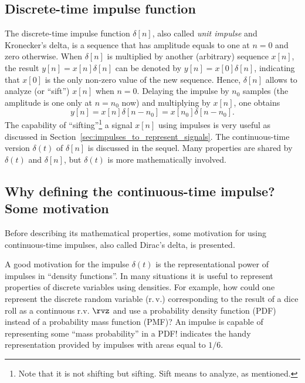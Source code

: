 \subsection{Discrete-time impulse function}

The discrete-time impulse function $\delta[n]$, also called \emph{unit impulse} and Kronecker's delta, is a sequence that has amplitude equals to one at $n=0$ and zero otherwise. When $\delta[n]$ is multiplied by another (arbitrary) sequence $x[n]$, the result $y[n]=x[n] \delta[n]$ can be denoted by $y[n] = x[0] \delta[n]$, indicating that $x[0]$ is the only non-zero value of the new sequence. Hence, $\delta[n]$ allows to analyze (or ``sift'') $x[n]$ when $n=0$. Delaying the impulse by $n_0$ samples (the amplitude is one only at $n=n_0$ now) and multiplying by $x[n]$, one obtains 
\begin{equation}
y[n]=x[n] \delta[n-n_0] = x[n_0] \delta[n-n_0].
\label{eq:siftingDiscreteTime}
\end{equation}
The capability of ``sifting''\footnote{Note that it is not shifting but sifting. Sift means to analyze, as mentioned.} a signal $x[n]$ using impulses is very useful as discussed in Section~\ref{sec:impulses_to_represent_signals}. The continuous-time version $\delta(t)$ of $\delta[n]$ is discussed in the sequel. Many properties are shared by $\delta(t)$ and $\delta[n]$, but $\delta(t)$ is more mathematically involved.

\subsection{Why defining the continuous-time impulse? Some motivation}
\label{app:impulseMotivation}

Before describing its mathematical properties, some motivation for using continuous-time impulses, also called Dirac's delta, is presented.

A good motivation for the impulse $\delta(t)$ is the representational power of impulses in ``density functions''. 
In many situations it is useful to represent properties of discrete variables using densities. For example, how could one represent the discrete random variable (r.\,v.) corresponding to the result of a dice roll as a continuous r.v. $\rvz$ and use a probability density function (PDF) instead of a probability mass function (PMF)? An impulse is capable of representing some ``mass probability'' in a PDF!  indicates the handy representation provided by impulses with areas equal to $1/6$.

